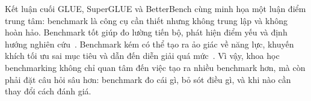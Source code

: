 \begin{summarybox}{Kết luận cuối}
GLUE, SuperGLUE và BetterBench cùng minh họa một luận điểm trung tâm: benchmark là công cụ cần thiết nhưng không trung lập và không hoàn hảo. Benchmark tốt giúp đo lường tiến bộ, phát hiện điểm yếu và định hướng nghiên cứu~\cite{glue,superglue}. Benchmark kém có thể tạo ra ảo giác về năng lực, khuyến khích tối ưu sai mục tiêu và dẫn đến diễn giải quá mức~\cite{betterbench}. Vì vậy, khoa học benchmarking không chỉ quan tâm đến việc tạo ra nhiều benchmark hơn, mà còn phải đặt câu hỏi sâu hơn: benchmark đo cái gì, bỏ sót điều gì, và khi nào cần thay đổi cách đánh giá.
\end{summarybox}